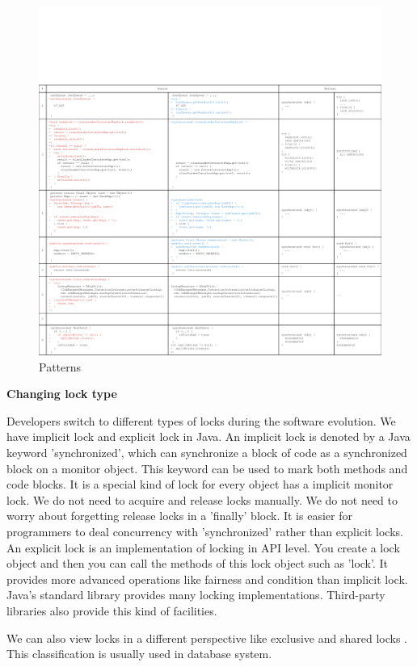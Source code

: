 \begin{figure}
	\centering
	\includegraphics[width=1\textwidth]{patterns}
	\caption{Patterns}
\end{figure}

\textbf{Changing lock type}

Developers switch to different types of locks during the software evolution. We have implicit lock and explicit lock in Java. An implicit lock is denoted by a Java keyword 'synchronized', which can synchronize a block of code as a synchronized block on a monitor object. This keyword can be used to mark both methods and code blocks. It is a special kind of lock for every object has a implicit monitor lock. We do not need to acquire and release locks manually. We do not need to worry about forgetting release locks in a 'finally' block. It is easier for programmers to deal concurrency with 'synchronized' rather than explicit locks. An explicit lock is an implementation of locking in API level. You create a lock object and then you can call the methods of this lock object such as 'lock'. It provides more advanced operations like fairness and condition than implicit lock. Java's standard library provides many locking implementations. Third-party libraries also provide this kind of facilities.

We can also view locks in a different perspective like exclusive and shared locks \cite{journals/jacm/KedemS83}. This classification is usually used in database system.

